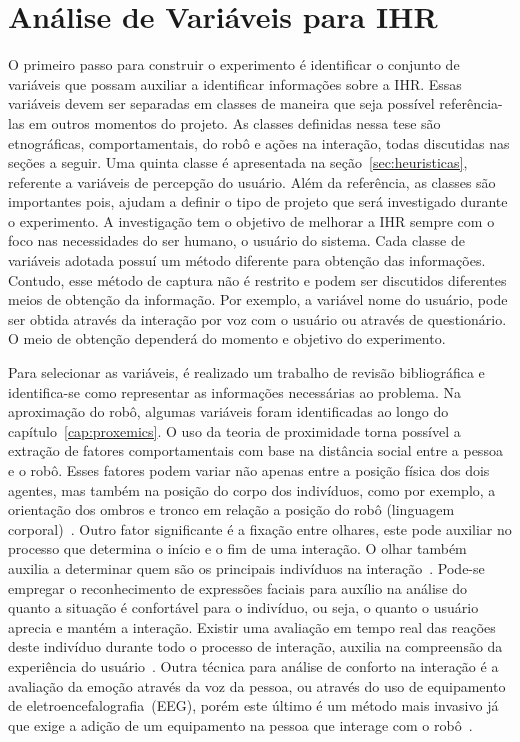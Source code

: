 \section{Análise de Variáveis para IHR}
\label{sec:variáveis}
O primeiro passo para construir o experimento é identificar o conjunto de variáveis que possam auxiliar a identificar informações sobre a IHR. Essas variáveis devem ser separadas em classes de maneira que seja possível referência-las em outros momentos do projeto. As classes definidas nessa tese são etnográficas, comportamentais, do robô e ações na interação, todas discutidas nas seções a seguir. Uma quinta classe é apresentada na seção~\ref{sec:heuristicas}, referente a variáveis de percepção do usuário. Além da referência, as classes são importantes pois, ajudam a definir o tipo de projeto que será investigado durante o experimento. A investigação tem o objetivo de melhorar a IHR sempre com o foco nas necessidades do ser humano, o usuário do sistema. Cada classe de variáveis adotada possuí um método diferente para obtenção das informações. Contudo, esse método de captura não é restrito e podem ser discutidos diferentes meios de obtenção da informação. Por exemplo, a variável nome do usuário, pode ser obtida através da interação por voz com o usuário ou através de questionário. O meio de obtenção dependerá do momento e objetivo do experimento.

Para selecionar as variáveis, é realizado um trabalho de revisão bibliográfica e identifica-se como representar as informações necessárias ao problema. Na aproximação do robô, algumas variáveis foram identificadas ao longo do capítulo~\ref{cap:proxemics}. O uso da teoria de proximidade torna possível a extração de fatores comportamentais com base na distância social entre a pessoa e o robô. Esses fatores podem variar não apenas entre a posição física dos dois agentes, mas também na posição do corpo dos indivíduos, como por exemplo, a orientação dos ombros e tronco em relação a posição do robô (linguagem corporal)~\cite{mead:2016}. Outro fator significante é a fixação entre olhares, este pode auxiliar no processo que determina o início e o fim de uma interação. O olhar também auxilia a determinar quem são os principais indivíduos na interação~\cite{mumm:2011, srinivasan:2012}. Pode-se empregar o reconhecimento de expressões faciais para auxílio na análise do quanto a situação é confortável para o indivíduo, ou seja, o quanto o usuário aprecia e mantém a interação. Existir uma avaliação em tempo real das reações deste indivíduo durante todo o processo de interação, auxilia na compreensão da experiência do usuário~\cite{amaral:2014}. Outra técnica para análise de conforto na interação é a avaliação da emoção através da voz da pessoa, ou através do uso de equipamento de eletroencefalografia~(EEG), porém este último é um método mais invasivo já que exige a adição de um equipamento na pessoa que interage com o robô~\cite{bos:2006, lee:2014}.

